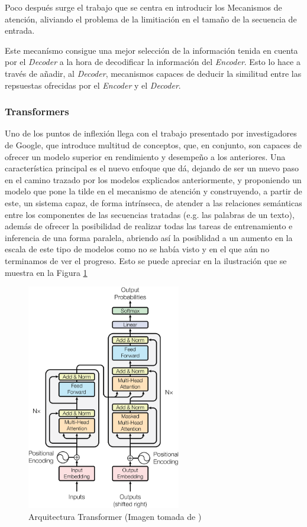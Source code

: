 Poco después surge el trabajo \cite{bahdanau2014neural} que se centra en introducir los Mecanismos de atención, aliviando el problema de la limitiación en el tamaño de la secuencia de entrada.

Este mecanísmo consigue una mejor selección de la información tenida en cuenta por el \textit{Decoder} a la hora de decodificar la información del \textit{Encoder}. Esto lo hace a través de añadir, al \textit{Decoder}, mecanismos capaces de deducir la similitud entre las repsuestas ofrecidas por el \textit{Encoder} y el \textit{Decoder}.
\newpage
\subsubsection{Transformers}

Uno de los puntos de inflexión llega con el trabajo \cite{vaswani2017attention} presentado por investigadores de Google, que introduce multitud de conceptos, que, en conjunto, son capaces de ofrecer un modelo superior en rendimiento y desempeño a los anteriores. Una característica principal es el nuevo enfoque que dá, dejando de ser un nuevo paso en el camino trazado por los modelos explicados anteriormente, y proponiendo un modelo que pone la tilde en el mecanismo de atención y construyendo, a partir de este, un sistema capaz, de forma intrínseca, de atender a las relaciones semánticas entre los componentes de las secuencias tratadas (e.g. las palabras de un texto), además de ofrecer la posibilidad de realizar todas las tareas de entrenamiento e inferencia de una forma paralela, abriendo así la posiblidad a un aumento en la escala de este tipo de modelos como no se había visto y en el que aún no terminamos de ver el progreso. Esto se puede apreciar en la ilustración que se muestra en la Figura \ref{fig:Transformer Architecture}

\begin{figure} [hb]
	\centering
	\includegraphics[width = 0.6\textwidth]{Imagenes/Vectorial/Transformer.pdf}
	\caption{Arquitectura Transformer (Imagen tomada de \cite{vaswani2017attention})}%
	\label{fig:Transformer Architecture}	
\end{figure}

